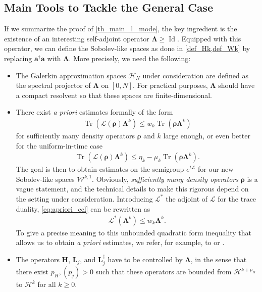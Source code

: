 \documentclass{article}
\newcommand{\xL}{\mathcal{L}}
\newcommand{\xH}{\mathcal{H}}
\newcommand{\xtr}[1]{\operatorname{Tr}\left( #1 \right)}
\newcommand{\xW}{\mathcal{W}}
\let\bf\boldsymbol
\newcommand{\Id}{\operatorname{Id}}
\newcommand{\orho}{{\bf \rho}}
\newcommand{\oa}{{\bf a}}
\newcommand{\oL}{{\bf L}}
\newcommand{\oH}{{\bf H}}
\newcommand{\oLambda}{{\bf \Lambda}}
\begin{document}
\subsection{Main Tools to Tackle the General Case}
\label{subsec:general_tools}
If we summarize the proof of \cref{th_main_1_mode}, the key ingredient is the existence of an interesting self-adjoint operator $\oLambda\geq \Id$. Equipped with this operator, we can define the Sobolev-like spaces as done in \cref{def_Hk,def_Wk} by replacing $\oa^\dag \oa$ with $\oLambda$. More precisely, we need the following:
\begin{itemize}
    \item The Galerkin approximation spaces $\xH_N$ under consideration are defined as the spectral projector of $\oLambda$ on $[0,N]$. For practical purposes, $\oLambda$ should have a compact resolvent so that these spaces are finite-dimensional.
    \item There exist \textit{a priori} estimates formally of the form
    \begin{align}
        \label{eq:apriori_ccl}
        \xtr{\xL(\orho)\oLambda^k} \leq w_k \xtr{\orho \oLambda^k}
    \end{align}
    for sufficiently many density operators $\orho$ and $k$ large enough, or even better for the uniform-in-time case
        \begin{align}
            \label{eq:apriori_ccl_strong}
        \xtr{\xL(\orho)\oLambda^k} \leq \eta_k -\mu_k \xtr{\orho \oLambda^k}.
    \end{align}
    The goal is then to obtain estimates on the semigroup $e^{t\xL}$ for our new Sobolev-like spaces $\xW^{k,1}$. Obviously, \textit{sufficiently many density operators $\orho$} is a vague statement, and the technical details to make this rigorous depend on the setting under consideration. Introducing $\xL^*$ the adjoint of $\xL$ for the trace duality,
    \cref{eq:apriori_ccl} can be rewritten as
    \begin{align}
        \xL^*(\oLambda^k) \leq w_k \oLambda^k.
    \end{align}
    To give a precise meaning to this unbounded quadratic form inequality that allows us to obtain \textit{a priori} estimates, we refer, for example, to \cite{chebotarevPrioriEstimatesQuantum2003} or \cite[Section 3.6]{fagnolaQuantumMarkovSemigroups1999}.
    \item The operators $\oH$, $\oL_j$, and $\oL_j^\dag$ have to be controlled by $\oLambda$, in the sense that there exist $p_H,(p_j)>0$ such that these operators are bounded from $\xH^{k+p_H}$ to $\xH^k$ for all $k \geq 0$.
\end{itemize}
\end{document}
